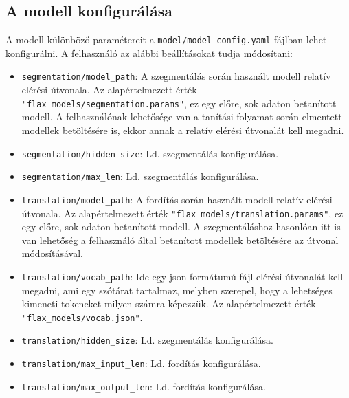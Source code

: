 \subsection{A modell konfigurálása}
A modell különböző paramétereit a \texttt{model/model\_config.yaml} fájlban
lehet konfigurálni. A felhasználó az alábbi beállításokat tudja módosítani:
\begin{itemize}
    \item \texttt{segmentation/model\_path}: A szegmentálás során használt
        modell relatív elérési útvonala. Az alapértelmezett érték
        \texttt{"flax\_models/segmentation.params"}, ez egy előre, sok adaton
        betanított modell. A felhasználónak lehetősége van a tanítási folyamat
        során elmentett modellek betöltésére is, ekkor annak a relatív elérési
        útvonalát kell megadni.
    \item \texttt{segmentation/hidden\_size}: Ld. szegmentálás konfigurálása.
    \item \texttt{segmentation/max\_len}: Ld. szegmentálás konfigurálása.
    \item \texttt{translation/model\_path}: A fordítás során használt modell
        relatív elérési útvonala. Az alapértelmezett érték
        \texttt{"flax\_models/translation.params"}, ez egy előre, sok adaton
        betanított modell. A szegmentáláshoz hasonlóan itt is van lehetőség
        a felhasználó által betanított modellek betöltésére az útvonal
        módosításával.
    \item \texttt{translation/vocab\_path}: Ide egy json formátumú fájl elérési
        útvonalát kell megadni, ami egy szótárat tartalmaz, melyben szerepel,
        hogy a lehetséges kimeneti tokeneket milyen számra képezzük. Az
        alapértelmezett érték \texttt{"flax\_models/vocab.json"}.
    \item \texttt{translation/hidden\_size}: Ld. szegmentálás konfigurálása.
    \item \texttt{translation/max\_input\_len}: Ld. fordítás konfigurálása.
    \item \texttt{translation/max\_output\_len}: Ld. fordítás konfigurálása.
\end{itemize}

